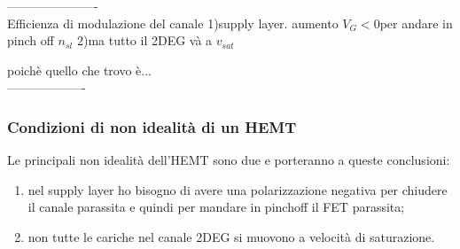 ----------------------\\
Efficienza di modulazione del canale
1)supply layer. aumento $V_G<0$per andare in pinch off $n_{sl}$
2)ma tutto il 2DEG và a $v_{sat}$

poichè quello che trovo è...\\
-------------------\\
\cleardoublepage
\subsubsection{Condizioni di non idealità di un HEMT}
Le principali non idealità dell'HEMT sono due e porteranno a queste conclusioni:
\begin{enumerate}
    \item nel supply layer ho bisogno di avere una polarizzazione negativa per chiudere il canale parassita  e quindi per mandare in pinchoff il FET parassita;
    \item non tutte le cariche nel canale 2DEG si muovono a velocità di saturazione.
\end{enumerate}
